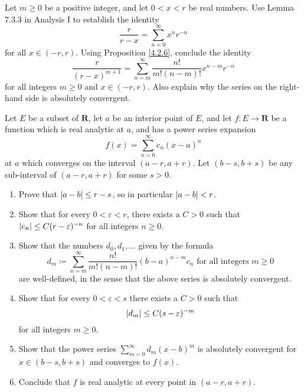 \begin{exercise}\label{ex 4.2.7}
    Let \(m \geq 0\) be a positive integer, and let \(0 < x < r\) be real numbers.
    Use Lemma 7.3.3 in Analysis I to establish the identity
    \[
        \frac{r}{r - x} = \sum_{n = 0}^\infty x^n r^{-n}
    \]
    for all \(x \in (-r, r)\).
    Using Proposition \ref{4.2.6}, conclude the identity
    \[
        \frac{r}{(r - x)^{m + 1}} = \sum_{n = m}^\infty \frac{n!}{m! (n - m)!} x^{n - m} r^{-n}
    \]
    for all integers \(m \geq 0\) and \(x \in (-r, r)\).
    Also explain why the series on the right-hand side is absolutely convergent.
\end{exercise}

\begin{exercise}\label{ex 4.2.8}
    Let \(E\) be a subset of \(\mathbf{R}\), let \(a\) be an interior point of \(E\), and let \(f : E \to \mathbf{R}\) be a function which is real analytic at \(a\), and has a power series expansion
    \[
        f(x) = \sum_{n = 0}^\infty c_n (x - a)^n
    \]
    at \(a\) which converges on the interval \((a - r, a + r)\).
    Let \((b - s, b + s)\) be any sub-interval of \((a - r, a + r)\) for some \(s > 0\).
    \begin{enumerate}
        \item Prove that \(\abs*{a - b} \leq r - s\), so in particular \(\abs*{a - b} < r\).
        \item Show that for every \(0 < \varepsilon < r\), there exists a \(C > 0\) such that \(\abs*{c_n} \leq C(r - \varepsilon)^{-n}\) for all integers \(n \geq 0\).
        \item Show that the numbers \(d_0, d_1, \dots\) given by the formula
              \[
                  d_m \coloneqq \sum_{n = m}^\infty \frac{n!}{m! (n - m)!} (b - a)^{n - m} c_n \text{ for all integers } m \geq 0
              \]
              are well-defined, in the sense that the above series is absolutely convergent.
        \item Show that for every \(0 < \varepsilon < s\) there exists a \(C > 0\) such that
              \[
                  \abs*{d_m} \leq C(s - \varepsilon)^{-m}
              \]
              for all integers \(m \geq 0\).
        \item Show that the power series \(\sum_{m = 0}^\infty d_m (x - b)^m\) is absolutely convergent for \(x \in (b - s, b + s)\) and converges to \(f(x)\).
        \item Conclude that \(f\) is real analytic at every point in \((a - r, a + r)\).
    \end{enumerate}
\end{exercise}
